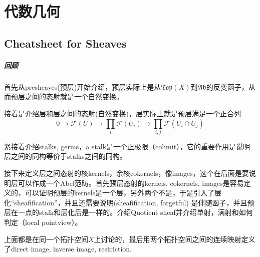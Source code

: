 \chapter{代数几何}
\section{Cheatsheet for Sheaves}
\paragraph{回顾}
首先从presheaves(预层)开始介绍，预层实际上是从$\mathfrak{Top}(X)$到$\mathfrak{Ab}$的反变函子，从而预层之间的态射就是一个自然变换。

接着是介绍层和层之间的态射(自然变换)，层实际上就是预层满足一个正合列
\[0\longrightarrow \mathcal{F}(U) \longrightarrow \prod_i \mathcal{F}(U_i) \longrightarrow \prod_{i,j} \mathcal{F}(U_i \cap U_j) \]

紧接着介绍stalks, germs，a stalk是一个正极限（colimit），它的重要作用是说明层之间的同构等价于stalks之间的同构。

接下来定义层之间态射的核kernels，余核cokernels，像images，这个在后面是要说明层可以作成一个Abel范畴。首先预层态射的kernels, cokernels, images是容易定义的，可以证明预层的kernels是一个层，另外两个不是，于是引入了层化``sheafification''，并且还需要说明(sheafification, forgetful) 是伴随函子，并且预层在一点的stalk和层化后是一样的。介绍Quotient sheaf并介绍单射，满射和如何判定（local pointview）。

上面都是在同一个拓扑空间$X$上讨论的，最后用两个拓扑空间之间的连续映射定义了direct image, inverse image, restriction.


